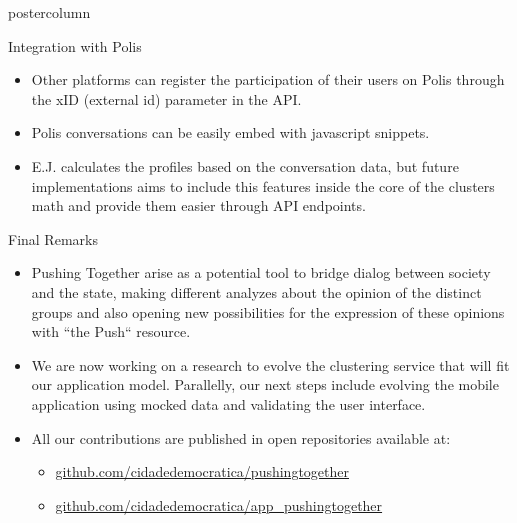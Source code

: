 \documentclass[final,hyperref={pdfpagelabels=false}]{beamer}
\begin{document}
\begin{frame}
\begin{columns}
\begin{column}{.49\textwidth}
\begin{beamercolorbox}[center,wd=\textwidth]{postercolumn}
\begin{minipage}[T]{.95\textwidth}
{\begin{block}{Integration with Polis}
  \begin{itemize}
    \item Other platforms can register the participation of their users on Polis
    through the xID (external id) parameter in the API.

    \item Polis conversations can be easily embed with javascript snippets.

    \item E.J. calculates the profiles based on the conversation data, but future
    implementations aims to include this features inside the core of the clusters
    math and provide them easier through API endpoints.
  \end{itemize}
\end{block}

\begin{block}{Final Remarks}
  \begin{itemize}
    \item Pushing Together arise as a potential tool to bridge dialog between society and
    the state, making different analyzes about the opinion of the distinct groups
    and also opening new possibilities for the expression of these opinions with ``the
    Push`` resource.

    \item We are now working on a research to evolve the clustering service that
    will fit our application model. Parallelly, our next steps include evolving the
    mobile application using mocked data and validating the user interface.

    \item All our contributions are published in open repositories available at:
      \begin{itemize}
        \item \url{github.com/cidadedemocratica/pushingtogether}
        \item \url{github.com/cidadedemocratica/app_pushingtogether}
      \end{itemize}
  \end{itemize}
\end{block}
      }
        \end{minipage}
      \end{beamercolorbox}
    \end{column}
  \end{columns}
\end{frame}
\end{document}
